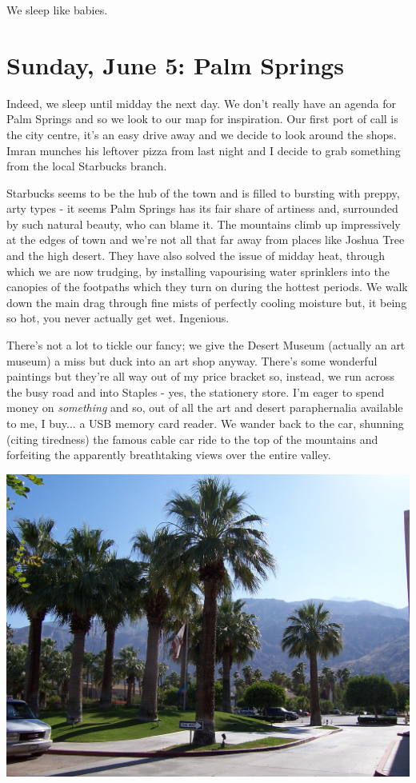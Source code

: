\documentclass[a5paper,titlepage,11pt]{book}
\begin{document}
We sleep like babies.

\chapter[Palm Springs]{Sunday, June 5:  Palm Springs}
Indeed, we sleep until midday the next day.  We don't really have an agenda for Palm Springs and so we look to our map for inspiration.  Our first port of call is the city centre, it's an easy drive away and we decide to look around the shops.  Imran munches his leftover pizza from last night and I decide to grab something from the local Starbucks branch.

Starbucks seems to be the hub of the town and is filled to bursting with preppy, arty types - it seems Palm Springs has its fair share of artiness and, surrounded by such natural beauty, who can blame it.  The mountains climb up impressively at the edges of town and we're not all that far away from places like Joshua Tree and the high desert.  They have also solved the issue of midday heat, through which we are now trudging, by installing vapourising water sprinklers into the canopies of the footpaths which they turn on during the hottest periods.  We walk down the main drag through fine mists of perfectly cooling moisture but, it being so hot, you never actually get wet.  Ingenious.

There's not a lot to tickle our fancy; we give the Desert Museum (actually an art museum) a miss but duck into an art shop anyway.  There's some wonderful paintings but they're all way out of my price bracket so, instead, we run across the busy road and into Staples - yes, the stationery store.  I'm eager to spend money on \emph{something} and so, out of all the art and desert paraphernalia available to me, I buy... a USB memory card reader.  We wander back to the car, shunning (citing tiredness) the famous cable car ride to the top of the mountains and forfeiting the apparently breathtaking views over the entire valley.

\begin{center}\includegraphics[width=\textwidth]{gfx/100_1625}\end{center}
\end{document}
